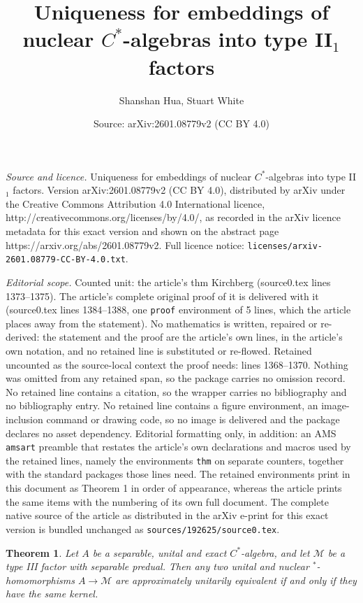 \documentclass[10pt,a4paper]{amsart}
\title{Uniqueness for embeddings of nuclear $C^*$-algebras into type II$_{1}$ factors}
\author{Shanshan Hua, Stuart White}
\date{Source: arXiv:2601.08779v2 (CC BY 4.0)}
\newtheorem{thm}{Theorem}
\begin{document}
\maketitle

\noindent\emph{Source and licence.} Uniqueness for embeddings of nuclear $C^*$-algebras into type II$_{1}$ factors. Version arXiv:2601.08779v2 (CC BY 4.0), distributed by arXiv under the Creative Commons Attribution 4.0 International licence, http://creativecommons.org/licenses/by/4.0/, as recorded in the arXiv licence metadata for this exact version and shown on the abstract page https://arxiv.org/abs/2601.08779v2. Full licence notice: \texttt{licenses/arxiv-2601.08779-CC-BY-4.0.txt}.\par\smallskip

\noindent\textit{Editorial scope.} Counted unit: the article's thm Kirchberg (source0.tex lines 1373--1375). The article's complete original proof of it is delivered with it (source0.tex lines 1384--1388, one \texttt{proof} environment of 5 lines, which the article places away from the statement). No mathematics is written, repaired or re-derived: the statement and the proof are the article's own lines, in the article's own notation, and no retained line is substituted or re-flowed.  Retained uncounted as the source-local context the proof needs: lines 1368--1370.  Nothing was omitted from any retained span, so the package carries no omission record.  No retained line contains a citation, so the wrapper carries no bibliography and no bibliography entry.  No retained line contains a figure environment, an image-inclusion command or drawing code, so no image is delivered and the package declares no asset dependency.  Editorial formatting only, in addition: an AMS \texttt{amsart} preamble that restates the article's own declarations and macros used by the retained lines, namely the environments \texttt{thm} on separate counters, together with the standard packages those lines need.  The retained environments print in this document as Theorem 1 in order of appearance, whereas the article prints the same items with the numbering of its own full document.  The complete native source of the article as distributed in the arXiv e-print for this exact version is bundled unchanged as \texttt{sources/192625/source0.tex}.
\begin{thm}\label{Appendix:Thm}
Let $A$ be a separable, unital and exact $C^*$-algebra, and let $\mathcal M$ be a type III factor with separable predual. Then any two unital and nuclear $^*$-homomorphisms $A\to\mathcal M$ are approximately unitarily equivalent if and only if they have the same kernel.
\end{thm}
\end{document}
